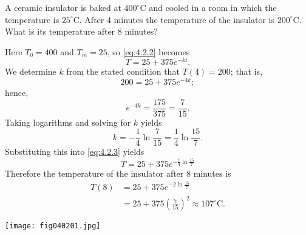 \documentclass{ximera}
\begin{document}
 
\begin{example}\label{example:4.2.1}
A ceramic insulator is baked at $400^\circ$C and cooled in a room in
which the temperature is $25^\circ$C. After 4 minutes the
temperature of the insulator is $200^\circ$C. What is its temperature
after 8 minutes?
\begin{explanation} Here $T_0=400$ and $T_m=25$, so \eqref{eq:4.2.2} becomes
\begin{equation} \label{eq:4.2.3}
T=25+375e^{-kt}.
\end{equation}
 We determine $k$ from the stated condition that  $T(4)=200$;
that is,
$$
200=25+375e^{-4k};
$$
 hence,
$$
e^{-4k} = \frac{175}{375} = \frac{7}{15}.
$$
 Taking logarithms and solving for $k$ yields
$$
k=-\frac{1}{4} \ln \frac{7}{15}=\frac{1}{4}\ln \frac{15}{7}.
$$
 Substituting this into \eqref{eq:4.2.3} yields
$$
T=25+375 e^{-\frac{t}{4} \ln \frac{15}{7}}
$$
Therefore the temperature of the insulator after
8 minutes is
$$\begin{array}{rl}
T(8) & = 25+375 e^{-2 \ln \frac{15}{7}} \\
& = 25+375 \left(\frac{7}{15}\right)^2 \approx
107^\circ \mbox{C}.
\end{array}$$
 
\begin{image}
  \texttt{[image: fig040201.jpg]} \end{image}
\end{explanation}
\end{example}
 
\end{document}

